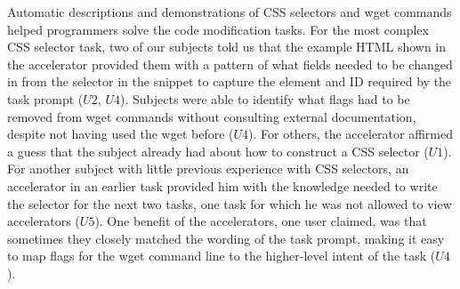 Automatic descriptions and demonstrations of CSS selectors and wget commands helped programmers solve the code modification tasks.
For the most complex CSS selector task, two of our subjects told us that the example HTML shown in the accelerator provided them with a pattern of what fields needed to be changed in from the selector in the snippet to capture the element and ID required by the task prompt ($U2$, $U4$).
Subjects were able to identify what flags had to be removed from wget commands without consulting external documentation, despite not having used the wget before ($U4$).
For others, the accelerator affirmed a guess that the subject already had about how to construct a CSS selector ($U1$).
For another subject with little previous experience with CSS selectors, an accelerator in an earlier task provided him with the knowledge needed to write the selector for the next two tasks, one task for which he was not allowed to view accelerators ($U5$).
One benefit of the accelerators, one user claimed, was that sometimes they closely matched the wording of the task prompt, making it easy to map flags for the wget command line to the higher-level intent of the task ($U4$).

